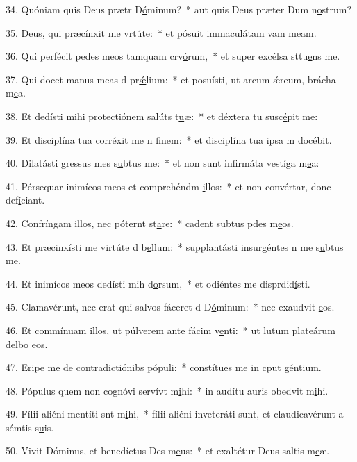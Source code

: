 34. Quóniam quis Deus prætr D\uline{ó}minum?~* aut quis Deus præter Dum n\uline{o}strum?\par 
35. Deus, qui præcínxit me vrt\uline{ú}te:~* et pósuit immaculátam vam m\uline{e}am.\par 
36. Qui perfécit pedes meos tamquam crv\uline{ó}rum,~* et super excélsa sttu\uline{e}ns me.\par 
37. Qui docet manus meas d pr\uline{ǽ}lium:~* et posuísti, ut arcum ǽreum, brácha m\uline{e}a.\par 
38. Et dedísti mihi protectiónem salúts t\uline{u}æ:~* et déxtera tu susc\uline{é}pit me:\par 
39. Et disciplína tua corréxit me n f\uline{i}nem:~* et disciplína tua ipsa m doc\uline{é}bit.\par 
40. Dilatásti gressus mes s\uline{u}btus me:~* et non sunt infirmáta vestíga m\uline{e}a:\par 
41. Pérsequar inimícos meos et comprehéndm \uline{i}llos:~* et non convértar, donc def\uline{í}ciant.\par 
42. Confríngam illos, nec póternt st\uline{a}re:~* cadent subtus pdes m\uline{e}os.\par 
43. Et præcinxísti me virtúte d b\uline{e}llum:~* supplantásti insurgéntes n me s\uline{u}btus me.\par 
44. Et inimícos meos dedísti mih d\uline{o}rsum,~* et odiéntes me disprdid\uline{í}sti.\par 
45. Clamavérunt, nec erat qui salvos fáceret d D\uline{ó}minum:~* nec exaudvit \uline{e}os.\par 
46. Et commínuam illos, ut púlverem ante fácim v\uline{e}nti:~* ut lutum plateárum delbo \uline{e}os.\par 
47. Eripe me de contradictiónibs p\uline{ó}puli:~* constítues me in cput g\uline{é}ntium.\par 
48. Pópulus quem non cognóvi servívt m\uline{i}hi:~* in audítu auris obedvit m\uline{i}hi.\par 
49. Fílii aliéni mentíti snt m\uline{i}hi,~* fílii aliéni inveteráti sunt, et claudicavérunt a sémtis s\uline{u}is.\par 
50. Vivit Dóminus, et benedíctus Des m\uline{e}us:~* et exaltétur Deus saltis m\uline{e}æ.\par 
